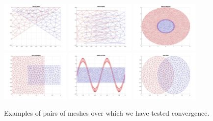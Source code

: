 \documentclass[11pt,a4paper, final, twoside]{article}
\theoremstyle{proposition}
\theoremstyle{definition}
\theoremstyle{remark}
\numberwithin{equation}{section}
\begin{document}
\begin{figure}[h]
\begin{center}
\includegraphics[width=0.3\textwidth]{pres1.jpg} \quad
\includegraphics[width=0.3\textwidth]{pres2.jpg} \quad
\includegraphics[width=0.3\textwidth]{pres3.jpg} \\
\includegraphics[width=0.3\textwidth]{pres5.jpg} \quad
\includegraphics[width=0.3\textwidth]{pres6.jpg} \quad
\includegraphics[width=0.3\textwidth]{pres7.jpg}
\caption{Examples of pairs of meshes over which we have tested convergence.}
\label{Fig:ExamplesShape}
\end{center}
\end{figure}
\end{document}
